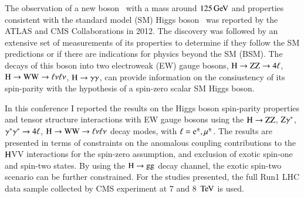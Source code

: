 The observation of a new
boson~\cite{Aad:2012tfa,Chatrchyan:2012ufa,Chatrchyan:2013lba} with a
mass around $125\,\mathrm{Ge\hspace{-.08em}V}$ and properties consistent with the standard
model (SM) Higgs boson~\cite{StandardModel67_1,
  Englert:1964et,Higgs:1964ia,Higgs:1964pj,Guralnik:1964eu,StandardModel67_2,StandardModel67_3}
was reported by the ATLAS and CMS Collaborations in 2012. The
discovery was followed by an extensive set of measurements of its
properties to determine if they follow the SM predictions or if there
are indications for physics beyond the SM (BSM). The decays of this boson
into two electroweak (EW) gauge bosons, $\mathrm{H}\to\mathrm{Z}\mathrm{Z}\to4\ell$, $\mathrm{H}\to\mathrm{W}\mathrm{W}\to\ell\nu\ell\nu$, $\mathrm{H}\to\gamma\gamma$, can provide
information on the consiustency of its spin-parity with the hypothesis of a spin-zero
scalar SM Higgs boson.

In this conference I reported the results on the Higgs boson
spin-parity properties and tensor structure interactions with EW gauge
bosons using the $\mathrm{H}\to\mathrm{Z}\mathrm{Z}$, $\mathrm{Z}\gamma^*$, $\gamma^*\gamma^*\to4\ell$,
$\mathrm{H}\to\mathrm{W}\mathrm{W}\to\ell\nu\ell\nu$ decay modes, with $\ell=\mathrm{\mathrm{e}}^{\pm},\mu^{\pm}$. The results are
presented in terms of constraints on the anomalous coupling
contributions to the $\mathrm{H}$VV interactions for the spin-zero
assumption, and exclusion of exotic spin-one and spin-two states.  By
using the $\mathrm{H}\to\mathrm{g}\mathrm{g}$ decay channel, the exotic spin-two scenario
can be further constrained.  For the studies presented, the full Run1
LHC data sample collected by CMS experiment at 7 and 8 $\,\mathrm{Te\hspace{-.08em}V}$ is used.


